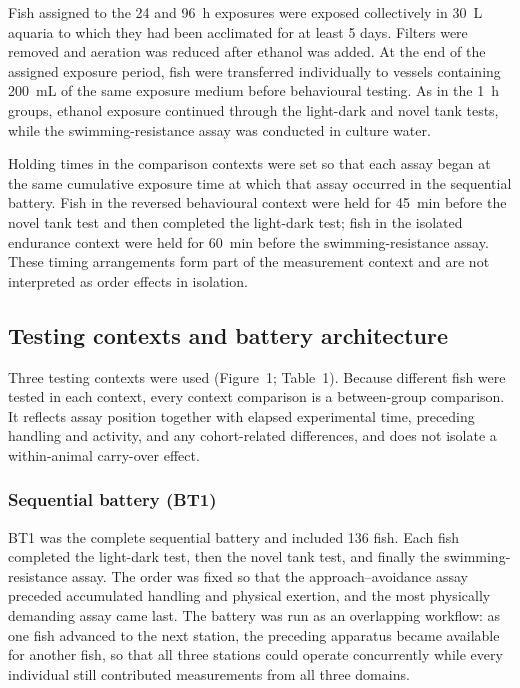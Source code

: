 \documentclass[12pt,a4paper]{article}
\begin{document}
Fish assigned to the 24 and 96~h exposures were exposed collectively in 30~L aquaria to which they had been acclimated for at least 5 days. Filters were removed and aeration was reduced after ethanol was added. At the end of the assigned exposure period, fish were transferred individually to vessels containing 200~mL of the same exposure medium before behavioural testing. As in the 1~h groups, ethanol exposure continued through the light-dark and novel tank tests, while the swimming-resistance assay was conducted in culture water.

Holding times in the comparison contexts were set so that each assay began at the same cumulative exposure time at which that assay occurred in the sequential battery. Fish in the reversed behavioural context were held for 45~min before the novel tank test and then completed the light-dark test; fish in the isolated endurance context were held for 60~min before the swimming-resistance assay. These timing arrangements form part of the measurement context and are not interpreted as order effects in isolation.

\subsection{Testing contexts and battery architecture}
\label{sec:design}
Three testing contexts were used (Figure~1; Table~1). Because different fish were tested in each context, every context comparison is a between-group comparison. It reflects assay position together with elapsed experimental time, preceding handling and activity, and any cohort-related differences, and does not isolate a within-animal carry-over effect.

\subsubsection{Sequential battery (BT1)}
\label{sec:bt1}
BT1 was the complete sequential battery and included 136 fish. Each fish completed the light-dark test, then the novel tank test, and finally the swimming-resistance assay. The order was fixed so that the approach--avoidance assay preceded accumulated handling and physical exertion, and the most physically demanding assay came last. The battery was run as an overlapping workflow: as one fish advanced to the next station, the preceding apparatus became available for another fish, so that all three stations could operate concurrently while every individual still contributed measurements from all three domains.
\end{document}
